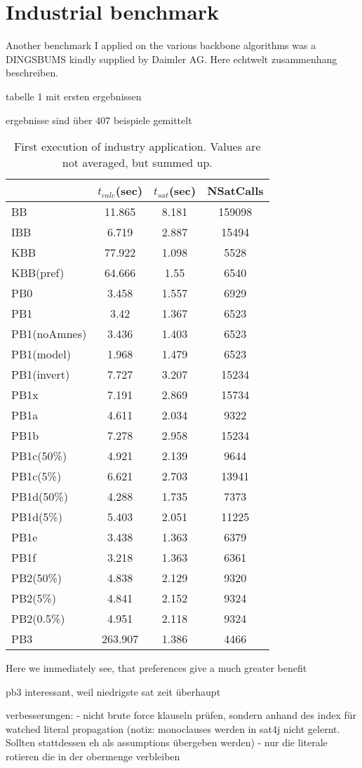 \section{Industrial benchmark}

Another benchmark I applied on the various backbone algorithms was a DINGSBUMS kindly supplied by Daimler AG. Here echtwelt zusammenhang beschreiben.



tabelle 1 mit ersten ergebnissen

ergebnisse sind über 407 beispiele gemittelt

\begin{table}[h!] %

\label{tab:vonThore1} %
\begin{tabular}{l| c c c }
&	$t_{calc}$(sec) &	$t_{sat}$(sec)	& NSatCalls \\
\hline
BB & 11.865 & 8.181 & 159098 \\
IBB & 6.719 & 2.887 & 15494 \\
KBB & 77.922 & 1.098 & 5528 \\
KBB(pref) & 64.666 & 1.55 & 6540 \\
PB0 & 3.458 & 1.557 & 6929 \\
PB1 & 3.42 & 1.367 & 6523 \\
PB1(noAmnes) & 3.436 & 1.403 & 6523 \\
PB1(model) & 1.968 & 1.479 & 6523 \\
PB1(invert) & 7.727 & 3.207 & 15234 \\
PB1x & 7.191 & 2.869 & 15734 \\
PB1a & 4.611 & 2.034 & 9322 \\
PB1b & 7.278 & 2.958 & 15234 \\
PB1c(50\%) & 4.921 & 2.139 & 9644 \\
PB1c(5\%) & 6.621 & 2.703 & 13941 \\
PB1d(50\%) & 4.288 & 1.735 & 7373 \\
PB1d(5\%) & 5.403 & 2.051 & 11225 \\
PB1e & 3.438 & 1.363 & 6379 \\
PB1f & 3.218 & 1.363 & 6361 \\
PB2(50\%) & 4.838 & 2.129 & 9320 \\
PB2(5\%) & 4.841 & 2.152 & 9324 \\
PB2(0.5\%) & 4.951 & 2.118 & 9324 \\
PB3 & 263.907 & 1.386 & 4466 \\
\end{tabular}
\caption{First execution of industry application. Values are not averaged, but summed up.}
\end{table}

Here we immediately see, that preferences give a much greater benefit 

pb3 interessant, weil niedrigste sat zeit überhaupt

verbesserungen:
- nicht brute force klauseln prüfen, sondern anhand des index für watched literal propagation (notiz: monoclauses werden in sat4j nicht gelernt. Sollten stattdessen eh als assumptions übergeben werden)
- nur die literale rotieren die in der obermenge verbleiben

